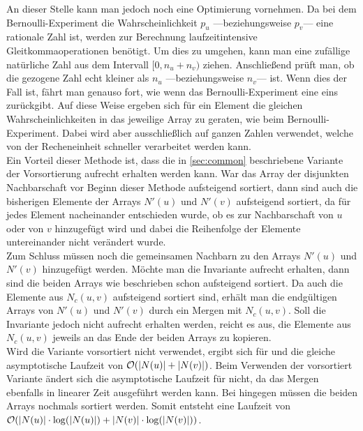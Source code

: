 An dieser Stelle  kann man jedoch noch eine Optimierung vornehmen.
Da bei dem Bernoulli-Experiment die Wahrscheinlichkeit $p_{u}$ ---beziehungsweise $p_{v}$--- eine
rationale Zahl ist, werden zur Berechnung laufzeitintensive Gleitkommaoperationen 
benötigt. Um dies zu umgehen, kann man eine zufällige natürliche Zahl aus dem Intervall
$[0, n_{u} + n_{v})$ ziehen. Anschließend prüft man, ob die gezogene Zahl 
echt kleiner als $n_{u}$ ---beziehungsweise $n_{v}$---
ist. Wenn dies der Fall ist, fährt man genauso fort, wie wenn das Bernoulli-Experiment eine eins
zurückgibt. Auf diese Weise 
ergeben sich für ein Element die gleichen Wahrscheinlichkeiten in das jeweilige Array zu geraten, wie
beim Bernoulli-Experiment. Dabei wird aber ausschließlich  auf ganzen Zahlen verwendet, welche
von der Recheneinheit schneller verarbeitet werden kann.
\\

Ein Vorteil dieser Methode ist, dass die in \ref{sec:common} beschriebene Variante der Vorsortierung aufrecht erhalten werden kann.
War das Array der disjunkten Nachbarschaft vor Beginn dieser Methode aufsteigend sortiert,
dann sind auch die bisherigen Elemente der Arrays $N'(u)$ und $N'(v)$ aufsteigend sortiert, da für jedes
Element nacheinander entschieden wurde, ob es zur Nachbarschaft von $u$ oder von $v$ hinzugefügt wird und dabei die
Reihenfolge der Elemente untereinander nicht verändert wurde.
\\

Zum Schluss müssen noch die gemeinsamen Nachbarn zu den Arrays $N'(u)$ und $N'(v)$ hinzugefügt werden.
Möchte man die Invariante aufrecht erhalten, dann sind die beiden Arrays wie beschrieben schon
aufsteigend sortiert. Da auch die Elemente aus $N_{c}(u,v)$ aufsteigend sortiert sind, erhält man
die endgültigen Arrays von $N'(u)$ und $N'(v)$ durch ein Mergen mit 
$N_{c}(u,v)$. Soll die Invariante jedoch
nicht aufrecht erhalten werden, reicht es aus, die Elemente aus 
$N_{c}(u,v)$ jeweils an das Ende der beiden Arrays
zu kopieren.
\\

Wird die Variante vorsortiert nicht verwendet, ergibt sich für \perm{} und \distr{}
die gleiche asymptotische Laufzeit von $\mathcal{O}(|N(u)| + |N(v)|)$. 
Beim Verwenden der vorsortiert Variante ändert sich die asymptotische Laufzeit für \distr{}
nicht, da das Mergen ebenfalls in linearer Zeit ausgeführt werden kann. Bei \perm{}
hingegen müssen die beiden Arrays nochmals sortiert werden. Somit entsteht
eine Laufzeit von $\mathcal{O}(|N(u)| \cdot \log(|N(u)|) + |N(v)| \cdot \log(|N(v)|))$.{}
\\

